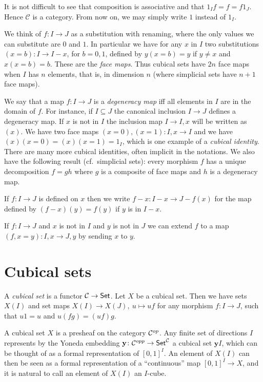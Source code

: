 \documentclass[10pt,a4paper]{article}
\newcommand{\CC}{{\mathcal C}}
\newcommand{\yoneda}{\mathbf{y}}
\begin{document}
It is not difficult to see that composition is associative and that $1_I f = f = f 1_J$.
Hence $\CC$ is a category. From now on, we may simply write $1$ instead of $1_I$.

 We think of $f:I\to J$ as a substitution with renaming,
 where the only values we can substitute are $0$ and $1$.
In particular we have for any $x$ in $I$ two substitutions $(x=b):I\to I-x$, for $b=0,1$,
defined by $y(x=b) = y$ if $y\neq x$ and $x(x=b) = b$. These are the \emph{face maps}.
Thus cubical sets have $2n$ face maps when $I$ has $n$ elements, that is, in dimension $n$
(where simplicial sets have $n+1$ face maps).

 We say that a map $f:I\to J$ is a {\em degeneracy map} iff all elements in $I$ are in
the domain of $f$. For instance, if $I\subseteq J$ the canonical inclusion $I \to J$ defines
a degeneracy map. If $x$ is not in $I$ the inclusion map $I \to I,x$ will be written as $(x)$.
We have two face maps $(x=0), (x=1):I,x\to I$ and we
have $(x)(x=0) = (x)(x=1) = 1_I$, which is one example of a \emph{cubical identity}.
There are many more cubical identities, often implicit in the notations. We also have
the following result (cf.\ simplicial sets): every morphism $f$ has a unique decomposition
$f=gh$ where $g$ is a composite of face maps and $h$ is a degeneracy map.

 If $f:I\to J$ is defined on $x$ then we write $f-x:I-x \to J-{f(x)}$ for the map defined by
$(f-x)(y) = f(y)$ if $y$ is in $I-x.$

If $f:I\to J$ and $x$ is not in $I$ and $y$ is not in $J$ we can
extend $f$ to a map $(f,x=y):I,x\to J,y$ by sending $x$ to $y$.

\section{Cubical sets}

A \emph{cubical set} is a functor $\CC\to{\sf Set}$.
Let $X$ be a cubical set. Then we have sets $X(I)$ and set maps
$X(I)\to X(J),~u\longmapsto uf$ for any morphism $f:I\to J$,
such that $u1 = u$ and $u(fg) = (uf)g$.

\medskip

A cubical set $X$ is a presheaf on the category ${\cal C}^{op}$. Any
finite set of directions $I$ represents by the Yoneda embedding
$\yoneda \colon {\cal C}^{opp} \to {\sf Set}^{\cal C}$ a cubical set
$\yoneda I$, which can be thought of as a formal representation of
$[0,1]^I$.  An element of $X(I)$ can then be seen as a formal
representation of a ``continuous'' map $[0,1]^I\to X$, and it is
natural to call an element of $X(I)$ an $I$-cube.
\end{document}
